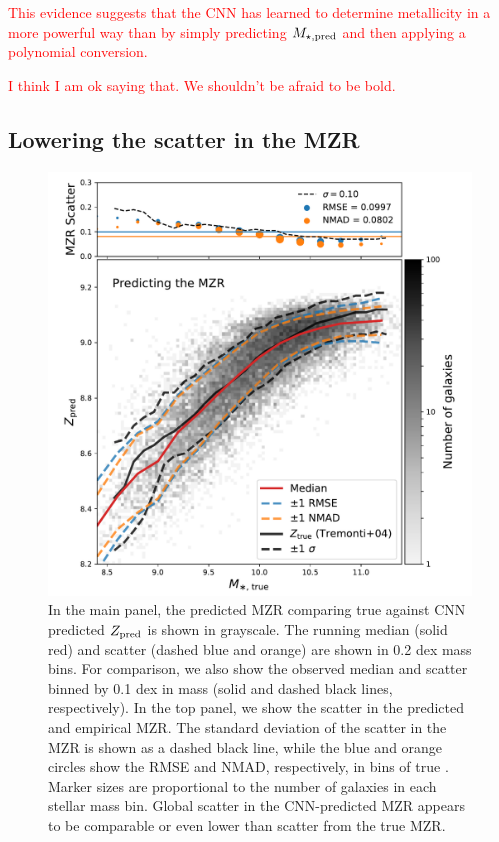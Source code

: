 \documentclass[fleqn,usenatbib]{mnras}
\newcommand{\editorial}[1]{\textcolor{red}{#1}}
\begin{document}
\editorial{This evidence suggests that the CNN has learned to determine metallicity in a more powerful way than by simply predicting $M_{\rm \star,pred}$ and then applying a polynomial conversion.}

\editorial{I think I am ok saying that. We shouldn't be afraid to be bold.}

\subsection{Lowering the scatter in the MZR}
\begin{figure}
	\includegraphics[width=\columnwidth]{05-mzr.pdf}
	\caption{\label{fig:mzr}
		In the main panel, the predicted MZR comparing true \mstar against CNN predicted $Z_{\rm pred}$ is shown in grayscale. The running median (solid red) and scatter (dashed blue and orange) are shown in 0.2 dex mass bins. For comparison, we also show the \citet{Tremonti2004} observed median and scatter binned by 0.1 dex in mass (solid and dashed black lines, respectively). In the top panel, we show the scatter in the predicted and empirical MZR. The standard deviation of the scatter in the MZR is shown as a dashed black line, while the blue and orange circles show the RMSE and NMAD, respectively, in bins of true \mstar. Marker sizes are proportional to the number of galaxies in each stellar mass bin. Global scatter in the CNN-predicted MZR appears to be comparable or even lower than scatter from the true MZR.}
\end{figure}
\end{document}
